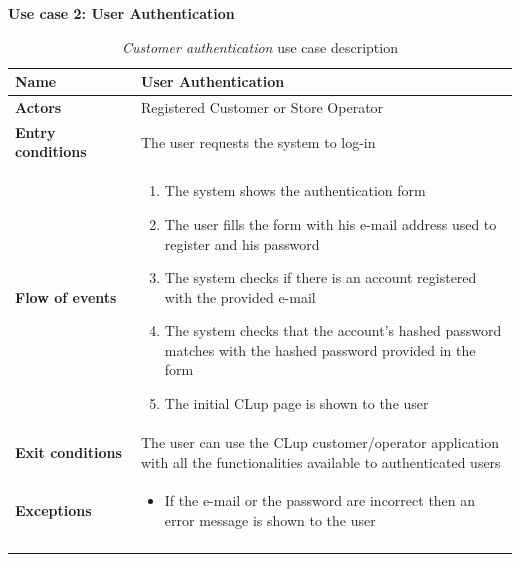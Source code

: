 \clearpage
\textbf{Use case 2: User Authentication}
\smallskip
{}
\begin{longtable}{p{0.25\linewidth}p{0.75\linewidth}}
    \toprule
    \textbf{Name}             & \textbf{User Authentication}                                                                                          \\
    \midrule
    \textbf{Actors}           & Registered Customer or Store Operator                                                                                 \\
    \midrule
    \textbf{Entry conditions} & The user requests the system to log-in                                                                                \\
    \midrule
    \textbf{Flow of events}   &
    \begin{enumerate}
        \item The system shows the authentication form
        \item The user fills the form with his e-mail address used to register and his password
        \item The system checks if there is an account registered with the provided e-mail
        \item The system checks that the account's hashed password matches with the hashed password provided in the form
        \item The initial CLup page is shown to the user
    \end{enumerate}                                                                                                                         \\
    \midrule
    \textbf{Exit conditions}  & The user can use the CLup customer/operator application with all the functionalities available to authenticated users \\
    \midrule
    \textbf{Exceptions}       &
    \begin{itemize}
        \item If the e-mail or the password are incorrect then an error message is shown to the user
    \end{itemize}                                                                                                                         \\
    \bottomrule
    \caption{\emph{Customer authentication} use case description}
\end{longtable}

